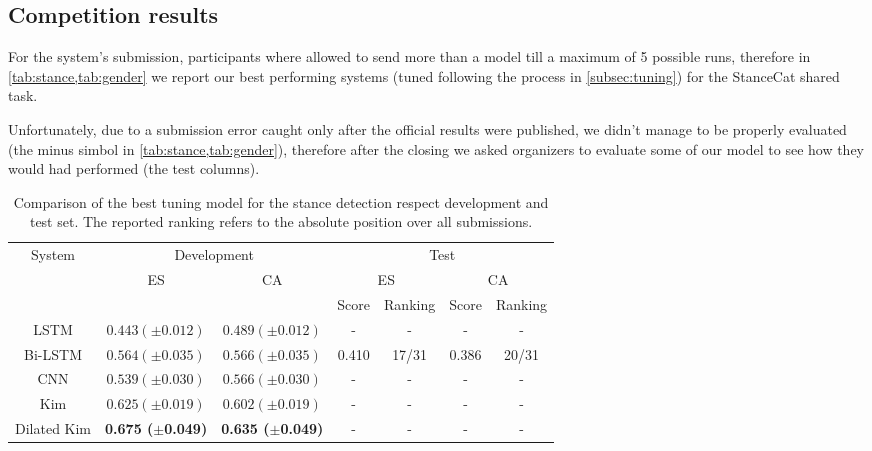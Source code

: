 \subsection{Competition results} \label{subsec:results}

For the system's submission, participants where allowed to send more than a model till a maximum of 5 possible runs, therefore in \cref{tab:stance,tab:gender} we report our best performing systems (tuned following the process in \cref{subsec:tuning}) for the StanceCat shared task.

Unfortunately, due to a submission error caught only after the official results were published, we didn't manage to be properly evaluated (the minus simbol in \cref{tab:stance,tab:gender}), therefore after the closing we asked organizers to evaluate some of our model to see how they would had performed (the test columns).

\begin{table}[h]
\footnotesize
\caption{Comparison of the best tuning model for the stance detection respect development and test set. The reported ranking refers to the absolute position over all submissions.}
\label{tab:stance}
\centering
\begin{tabular}{c|cc|cc|cc}
\toprule
\hline
\multirow{3}{*}{System}	& \multicolumn{2}{c|}{Development} & \multicolumn{4}{c}{Test}	\\
\cline{2-7}
						& \multirow{2}{*}{ES}	& \multirow{2}{*}{CA}	& \multicolumn{2}{c|}{ES} & \multicolumn{2}{c}{CA}	\\
\cline{4-7}
						&		&		& Score & Ranking & Score & Ranking \\
\hline
LSTM					& $0.443 (\pm0.012)$ & $0.489 (\pm0.012)$ & - & - & - & - \\
Bi-LSTM					& $0.564 (\pm0.035)$ & $0.566 (\pm0.035)$ & 0.410 & 17/31 & 0.386 & 20/31 \\
CNN						& $0.539 (\pm0.030)$ & $0.566 (\pm0.030)$ & - & - & - & - \\
Kim						& $0.625 (\pm0.019)$ & $0.602 (\pm0.019)$ & - & - & - & - \\
Dilated Kim				& \textbf{0.675 ($\pm$0.049)} & \textbf{0.635 ($\pm$0.049)} & - & - & - & - \\
\hline
\bottomrule
\end{tabular}
\end{table}


